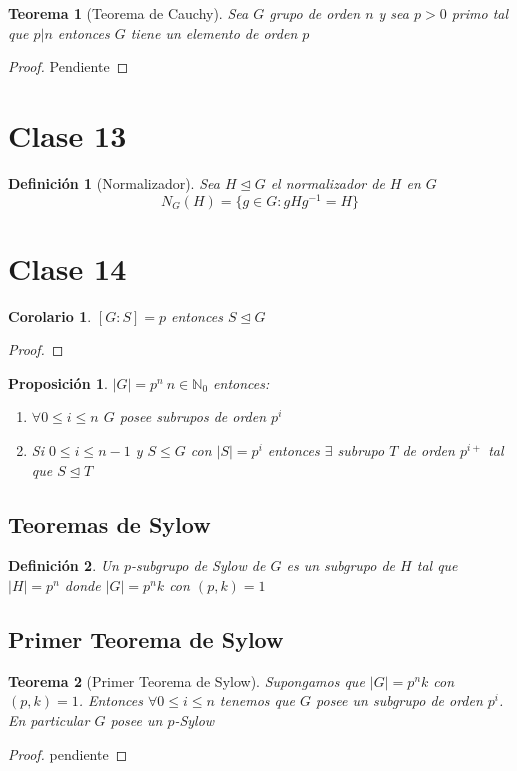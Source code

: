 \documentclass[10pt]{extarticle}
\theoremstyle{break}
\newtheorem{theorem}{Teorema}[section]
\newtheorem{corollary}{Corolario}[theorem]
\newtheorem{proposition}{Proposición}
\newtheorem{definition}{Definición}[section]
\theoremstyle{definition}
\begin{document}
\begin{theorem}[Teorema de Cauchy]
	Sea $G$ grupo de orden $ n $ y sea $ p>0 $ primo tal que $ p|n $ entonces $G$ tiene un elemento de orden $ p $
\end{theorem}

\begin{proof}
	Pendiente
\end{proof}


\section{Clase 13}

\begin{definition}[Normalizador]
	Sea $H\trianglelefteq G$ el normalizador de $H$ en $G$ 
	$$N_{G}(H)= \{g\in G: gHg^{-1}=H\}$$ 
\end{definition}


\section{Clase 14}

\begin{corollary}
	$ [G:S]=p $ entonces $ S \trianglelefteq G $
\end{corollary}
\begin{proof}
	
\end{proof}

\begin{proposition}
	$ |G|=p^{n} \ n\in \mathbb{N}_{0} $ entonces:
	\begin{enumerate}
		\item $ \forall 0\leq i\leq n$ $ G $ posee subrupos de orden $ p^{i} $
		\item Si $0\leq i\leq n-1$ y $S\leq G$ con $|S|=p^{i}$ entonces $\exists $ subrupo $T$ de orden $p^{i+}$ tal que $S \trianglelefteq T$ 
	\end{enumerate}
\end{proposition}


\subsection{Teoremas de Sylow}

\begin{definition}
	Un $p$-subgrupo de Sylow de $G$ es un subgrupo de $H$  tal que $\lvert H \rvert =p^{n}$ donde $\lvert G \rvert =p^{n}k$ con $(p,k)=1$ 
\end{definition}

\subsection{Primer Teorema de Sylow}
\begin{theorem}[Primer Teorema de Sylow] \label{14.1}
	Supongamos que $\lvert G \rvert =p^{n}k$ con $(p,k)=1$. Entonces $\forall 0\leq i\leq n$ tenemos que $G$ posee un subgrupo de orden $p^{i}$. En particular $G$ posee un $p$-Sylow 
\end{theorem}
\begin{proof}
	pendiente  
\end{proof}
\end{document}
